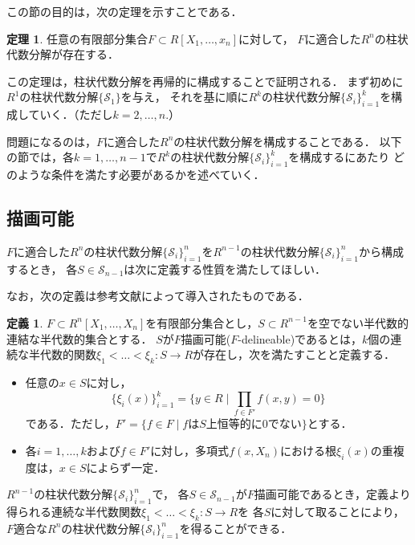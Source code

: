 \documentclass[uplatex, dvipdfmx]{jsarticle}
\newcommand{\calS}{\mathcal{S}}
\newcommand{\map}[3]{{#1}:{#2}\rightarrow{#3}}
\theoremstyle{definition}
\newtheorem{definition}{定義}[section]
\newtheorem{theorem}{定理}[section]
\begin{document}
この節の目的は，次の定理を示すことである．

\begin{theorem} \label{theorem:cad}
     任意の有限部分集合$F \subset R[X_1, \dots, x_n]$に対して，
     $F$に適合した$R^n$の柱状代数分解が存在する．
\end{theorem}

この定理は，柱状代数分解を再帰的に構成することで証明される．
まず初めに$R^1$の柱状代数分解$\{\calS_1\}$を与え，
それを基に順に$R^k$の柱状代数分解$\{\calS_i\}_{i=1}^k$を構成していく．（ただし$k=2, \dots, n$.）

問題になるのは，$F$に適合した$R^n$の柱状代数分解を構成することである．
以下の節では，各$k=1, \dots, n-1$で$R^k$の柱状代数分解$\{\calS_i\}_{i=1}^k$を構成するにあたり
どのような条件を満たす必要があるかを述べていく．

\subsection{描画可能}
$F$に適合した$R^n$の柱状代数分解$\{\calS_i\}_{i=1}^n$を$R^{n-1}$の柱状代数分解$\{\calS_i\}_{i=1}^n$から構成するとき，
各$S \in \calS_{n-1}$は次に定義する性質を満たしてほしい．

なお，次の定義は参考文献\cite{Collins}によって導入されたものである．

\begin{definition} 
     $F \subset R^n[X_1, \dots, X_n]$を有限部分集合とし，$S \subset R^{n-1}$を空でない半代数的連結な半代数的集合とする．
     $S$が$F$描画可能($F$-delineable)であるとは，$k$個の連続な半代数的関数$\map{\xi_1<\dots<\xi_k}{S}{R}$が存在し，次を満たすことと定義する．
     \begin{itemize}
          \item 任意の$ x \in S $に対し，
          \[
               \{\xi_i(x)\}_{i=1}^k = \{y \in R \mid \prod_{f \in F'}f(x,y)=0\}
          \]
          である．ただし，$F' = \{f \in F \mid \text{$f$は$S$上恒等的に0でない}\}$とする．
          \item 各$i=1, \dots, k$および$f \in F'$に対し，多項式$f(x,X_n)$における根$\xi_i(x)$の重複度は，$x\in S$によらず一定．
     \end{itemize}
\end{definition}

$R^{n-1}$の柱状代数分解$\{\calS_i\}_{i=1}^n$で，
各$S \in \calS_{n-1}$が$F$描画可能であるとき，定義より得られる連続な半代数関数$\map{\xi_1<\dots<\xi_k}{S}{R}$を
各$S$に対して取ることにより，$F$適合な$R^n$の柱状代数分解$\{\calS_i\}_{i=1}^n$を得ることができる．
\end{document}
